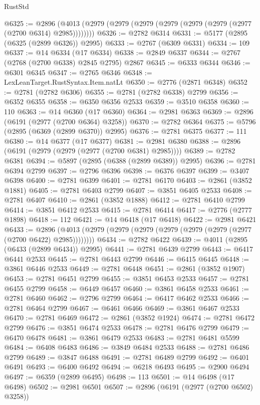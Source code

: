 \begin{lexlean}{RustStd}
\begin{coremodule}
@6325 := @2896 (@4013 (@2979 (@2979 (@2979 (@2979 (@2979 (@2979 (@2977 (@2700 @6314) @2985))))))))
@6326 := @2782 @6314
@6331 := @5177 (@2895 (@6325 (@2899 @6326)) @2995)
@6333 := @2767 (@6309 @6331)
@6334 := 109
@6337 := @14 @6334 (@17 @6334)
@6338 := @2849 @6337
@6344 := @2767 (@2768 (@2700 @6338) @2845 @2795) @2867
@6345 := @6333 @6344
@6346 := @6301 @6345
@6347 := @2765 @6346
@6348 := LexLeanTarget.RustSyntax.Item.natLt
@6350 := @2776 (@2871 @6348)
@6352 := @2781 (@2782 @6306)
@6355 := @2781 (@2782 @6338) @2799
@6356 := @6352 @6355
@6358 := @6350 @6356 @2533
@6359 := @3510 @6358
@6360 := 110
@6363 := @14 @6360 (@17 @6360)
@6364 := @2981 @6363
@6369 := @2896 (@6191 (@2977 (@2700 @6364) @3258))
@6370 := @2782 @6364
@6375 := @5796 (@2895 (@6369 (@2899 @6370)) @2995)
@6376 := @2781 @6375
@6377 := 111
@6380 := @14 @6377 (@17 @6377)
@6381 := @2981 @6380
@6388 := @2896 (@6191 (@2979 (@2979 (@2977 (@2700 @6381) @2985))))
@6389 := @2782 @6381
@6394 := @5897 (@2895 (@6388 (@2899 @6389)) @2995)
@6396 := @2781 @6394 @2799
@6397 := @2796 @6396
@6398 := @6376 @6397
@6399 := @3407 @6398
@6400 := @2781 @6399
@6401 := @2781 @6170
@6403 := @2861 (@3852 @1881)
@6405 := @2781 @6403 @2799
@6407 := @3851 @6405 @2533
@6408 := @2781 @6407
@6410 := @2861 (@3852 @1888)
@6412 := @2781 @6410 @2799
@6414 := @3851 @6412 @2533
@6415 := @2781 @6414
@6417 := @2776 (@2777 @1898)
@6418 := 112
@6421 := @14 @6418 (@17 @6418)
@6422 := @2981 @6421
@6433 := @2896 (@4013 (@2979 (@2979 (@2979 (@2979 (@2979 (@2979 (@2977 (@2700 @6422) @2985))))))))
@6434 := @2782 @6422
@6439 := @4011 (@2895 (@6433 (@2899 @6434)) @2995)
@6441 := @2781 @6439 @2799
@6443 := @6417 @6441 @2533
@6445 := @2781 @6443 @2799
@6446 := @6415 @6445
@6448 := @3861 @6446 @2533
@6449 := @2781 @6448
@6451 := @2861 (@3852 @1907)
@6453 := @2781 @6451 @2799
@6455 := @3851 @6453 @2533
@6457 := @2781 @6455 @2799
@6458 := @6449 @6457
@6460 := @3861 @6458 @2533
@6461 := @2781 @6460
@6462 := @2796 @2799
@6464 := @6417 @6462 @2533
@6466 := @2781 @6464 @2799
@6467 := @6461 @6466
@6469 := @3861 @6467 @2533
@6470 := @2781 @6469
@6472 := @2861 (@3852 @1924)
@6474 := @2781 @6472 @2799
@6476 := @3851 @6474 @2533
@6478 := @2781 @6476 @2799
@6479 := @6470 @6478
@6481 := @3861 @6479 @2533
@6483 := @2781 @6481 @5599
@6484 := @6408 @6483
@6486 := @3849 @6484 @2533
@6488 := @2781 @6486 @2799
@6489 := @3847 @6488
@6491 := @2781 @6489 @2799
@6492 := @6401 @6491
@6493 := @6400 @6492
@6494 := @6218 @6493
@6495 := @2900 @6494
@6497 := @6359 (@2899 @6495)
@6498 := 113
@6501 := @14 @6498 (@17 @6498)
@6502 := @2981 @6501
@6507 := @2896 (@6191 (@2977 (@2700 @6502) @3258))

\end{coremodule}
\end{lexlean}
